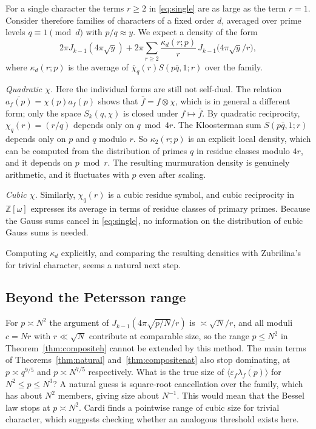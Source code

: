\documentclass[11pt]{amsart}
\theoremstyle{remark}
\newcommand{\eps}{\varepsilon}
\newcommand{\ov}{\overline}
\begin{document}
For a single character the terms $r\ge2$ in \eqref{eq:single} are as large as the term $r=1$. Consider therefore families of characters of a fixed order $d$, averaged over prime levels $q\equiv1\pmod d$ with $p/q\approx y$. We expect a density of the form
\[
2\pi J_{k-1}(4\pi\sqrt y)+2\pi\sum_{r\ge2}\frac{\kappa_d(r;p)}{r}\,J_{k-1}\bigl(4\pi\sqrt y/r\bigr),
\]
where $\kappa_d(r;p)$ is the average of $\bar\chi_q(r)S(p\bar q,1;r)$ over the family.

\emph{Quadratic $\chi$.} Here the individual forms are still not self-dual. The relation $\ov{a_f(p)}=\chi(p)a_f(p)$ shows that $\bar f=f\otimes\chi$, which is in general a different form; only the space $S_k(q,\chi)$ is closed under $f\mapsto\bar f$. By quadratic reciprocity, $\chi_q(r)=(r/q)$ depends only on $q\bmod4r$. The Kloosterman sum $S(p\bar q,1;r)$ depends only on $p$ and $q$ modulo $r$. So $\kappa_2(r;p)$ is an explicit local density, which can be computed from the distribution of primes $q$ in residue classes modulo $4r$, and it depends on $p\bmod r$. The resulting murmuration density is genuinely arithmetic, and it fluctuates with $p$ even after scaling.

\emph{Cubic $\chi$.} Similarly, $\chi_q(r)$ is a cubic residue symbol, and cubic reciprocity in $\mathbb Z[\omega]$ expresses its average in terms of residue classes of primary primes. Because the Gauss sums cancel in \eqref{eq:single}, no information on the distribution of cubic Gauss sums is needed.

Computing $\kappa_d$ explicitly, and comparing the resulting densities with Zubrilina's for trivial character, seems a natural next step.

\subsection{Beyond the Petersson range}
For $p\asymp N^2$ the argument of $J_{k-1}(4\pi\sqrt{p/N}/r)$ is $\asymp\sqrt N/r$, and all moduli $c=Nr$ with $r\ll\sqrt N$ contribute at comparable size, so the range $p\le N^{2}$ in Theorem~\ref{thm:compositeh} cannot be extended by this method. The main terms of Theorems~\ref{thm:natural} and~\ref{thm:compositenat} also stop dominating, at $p\asymp q^{9/5}$ and $p\asymp N^{7/5}$ respectively. What is the true size of $\langle\eps_f\ov{\lambda_f(p)}\rangle$ for $N^2\le p\le N^{3}$? A natural guess is square-root cancellation over the family, which has about $N^2$ members, giving size about $N^{-1}$. This would mean that the Bessel law stops at $p\asymp N^2$. Cardi \cite{Car} finds a pointwise range of cubic size for trivial character, which suggests checking whether an analogous threshold exists here.
\end{document}
